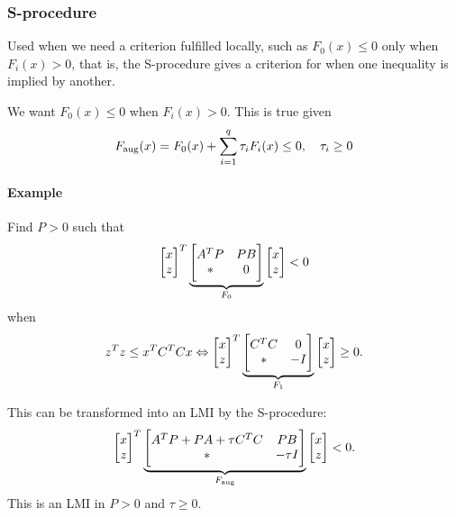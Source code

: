 \subsubsection{S-procedure}
Used when we need a criterion fulfilled locally, such as $F_0(x) \leq 0$ only when $F_i(x) > 0$, that is, the S-procedure gives a criterion for when one inequality is implied by another.

We want $F_0(x) \leq 0$ when $F_i(x) > 0$. This is true given
%
\begin{equation}
  F_\mathrm{aug}(x) = F_0(x) + \sum_{i=1}^q \tau_i F_i(x) \leq 0, \quad \tau_i \geq 0
\end{equation}

\paragraph{Example} Find $P>0$ such that
%
\begin{equation}
  \begin{bmatrix} x \\ z \end{bmatrix}^{T}
  \underbrace{\begin{bmatrix} A^{T} P & PB \\ * & 0 \end{bmatrix}}_{F_0}
  \begin{bmatrix} x \\ z \end{bmatrix}
  < 0
\end{equation}
%
when
%
\begin{equation}
  z^{T} z \leq x^{T} C^{T} C x
  \Leftrightarrow
  \begin{bmatrix} x \\ z \end{bmatrix}^{T}
  \underbrace{\begin{bmatrix} C^{T} C & 0 \\ * & -I \end{bmatrix}}_{F_1}
  \begin{bmatrix} x \\ z \end{bmatrix}
  \geq 0.
\end{equation}

This can be transformed into an LMI by the S-procedure:
%
\begin{equation}
  \begin{bmatrix} x \\ z \end{bmatrix}^{T}
  \underbrace
    {
      \begin{bmatrix}
        A^{T} P + PA + \tau C^{T} C & PB \\
        * & -\tau I
      \end{bmatrix}
    }_{F_\mathrm{aug}}
  \begin{bmatrix} x \\ z \end{bmatrix}
  < 0.
\end{equation}
%
This is an LMI in $P>0$ and $\tau \geq 0$.

